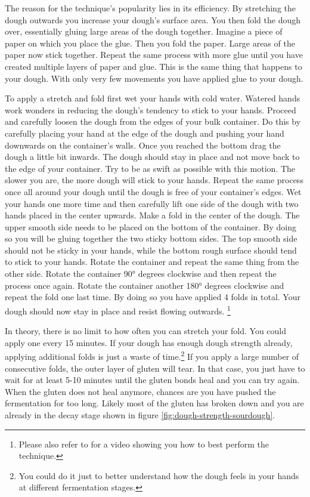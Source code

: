 The reason for the technique's popularity lies in its efficiency. By stretching
the dough outwards you increase your dough's surface area. You then fold the
dough over, essentially gluing large areas of the dough together. Imagine a
piece of paper on which you place the glue. Then you fold the paper. Large areas
of the paper now stick together. Repeat the same process with more glue until
you have created multiple layers of paper and glue. This is the same thing that
happens to your dough. With only very few movements you have applied glue to your
dough.

To apply a stretch and fold first wet your hands with cold water. Watered hands
work wonders in reducing the dough's tendency to stick to your hands. Proceed and
carefully loosen the dough from the edges of your bulk container. Do this by
carefully placing your hand at the edge of the dough and pushing your hand
downwards on the container's walls. Once you reached the bottom drag the dough
a little bit inwards. The dough should stay in place and not move back to the
edge of your container. Try to be as swift as possible with this motion. The
slower you are, the more dough will stick to your hands. Repeat the same process
once all around your dough until the dough is free of your container's edges.
Wet your hands one more time and then carefully lift one side of the dough with
two hands placed in the center upwards. Make a fold in the center of the dough.
The upper smooth side needs to be placed on the bottom of the container. By doing
so you will be gluing together the two sticky bottom sides. The top smooth side should
not be sticky in your hands, while the bottom rough surface should tend
to stick to your hands.  Rotate the container
and repeat the same thing from the other side. Rotate the container 90° degrees
clockwise and then repeat the process once again. Rotate the container another 180° degrees clockwise
and repeat the fold one last time. By doing so you have applied 4 folds in total. Your
dough should now stay in place and resist flowing outwards.
\footnote{Please also refer to \cite{stretch+and+fold+technique} for a video showing
you how to best perform the technique.}

In theory, there is no limit to how often you can stretch your fold. You could
apply one every 15 minutes. If your dough has enough dough strength already,
applying additional folds is just a waste of time.\footnote{You could do it just to better understand how the
dough feels in your hands at different fermentation stages.} If you apply a
large number of consecutive folds, the outer layer of gluten
will tear. In that case, you just have to wait for at least 5-10 minutes until
the gluten bonds heal and you can try again. When the gluten does not heal
anymore, chances are you have pushed the fermentation for too long. Likely
most of the gluten has broken down and you are already
in the decay stage shown in figure \ref{fig:dough-strength-sourdough}.

